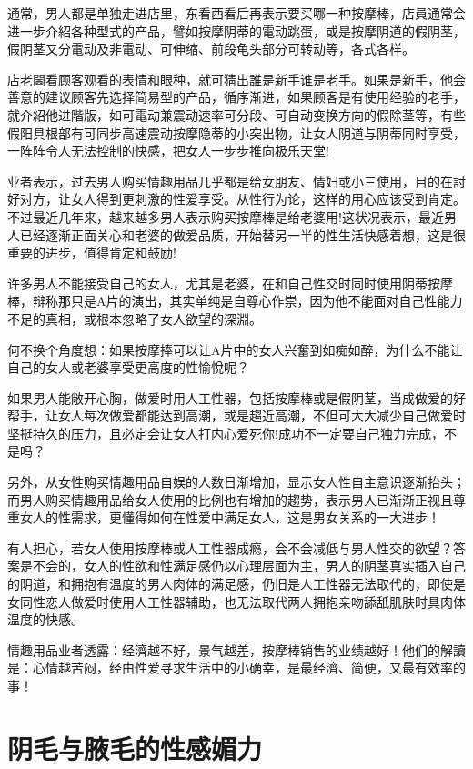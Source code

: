 \documentclass[12pt,UTF8]{ctexbook}
\begin{document}
通常，男人都是单独走进店里，东看西看后再表示要买哪一种按摩棒，店員通常会进一步介紹各种型式的产品，譬如按摩阴蒂的電动跳蛋，或是按摩阴道的假阴茎，假阴茎又分電动及非電动、可伸缩、前段龟头部分可转动等，各式各样。

店老閪看顾客观看的表情和眼种，就可猜出誰是新手谁是老手。如果是新手，他会善意的建议顾客先选择简易型的产品，循序渐进，如果顾客是有使用经验的老手，就介紹他进階版，如可電动兼震动速率可分段、可自动变换方向的假除茎等，有些假阳具根部有可同步高速震动按摩隐蒂的小突出物，让女人阴道与阴蒂同时享受，一阵阵令人无法控制的快感，把女人一步步推向极乐天堂!

业者表示，过去男人购买情趣用品几乎都是给女朋友、情妇或小三使用，目的在討好对方，让女人得到更刺激的性爱享受。从性行为论，这样的用心应该受到肯定。不过最近几年来，越来越多男人表示购买按摩棒是给老婆用!这状况表示，最近男人已经逐渐正面关心和老婆的做爱品质，开始替另一半的性生活快感着想，这是很重要的进步，值得肯定和鼓励!

许多男人不能接受自己的女人，尤其是老婆，在和自己性交时同时使用阴蒂按摩棒，辩称那只是A片的演出，其实单纯是自尊心作崇，因为他不能面对自己性能力不足的真相，或根本忽略了女人欲望的深淵。

何不换个角度想：如果按摩捧可以让A片中的女人兴奮到如痴如醉，为什么不能让自己的女人或老婆享受更高度的性愉悅呢？

如果男人能敞开心胸，做爱时用人工性器，包括按摩棒或是假阴茎，当成做爱的好帮手，让女人每次做爱都能达到高潮，或是趨近高潮，不但可大大减少自己做爱时坚挺持久的压力，且必定会让女人打内心爱死你!成功不一定要自己独力完成，不是吗？

另外，从女性购买情趣用品自娱的人数日渐增加，显示女人性自主意识逐渐抬头；而男人购买情趣用品给女人使用的比例也有增加的趨势，表示男人已渐渐正视且尊重女人的性需求，更懂得如何在性爱中满足女人，这是男女关系的一大进步！

有人担心，若女人使用按摩棒或人工性器成瘾，会不会减低与男人性交的欲望？答案是不会的，女人的性欲和性满足感仍以心理层面为主，男人的阴茎真实插入自己的阴道，和拥抱有温度的男人肉体的满足感，仍旧是人工性器无法取代的，即使是女同性恋人做爱时使用人工性器辅助，也无法取代两人拥抱亲吻舔舐肌肤时具肉体温度的快感。

情趣用品业者透露：经濟越不好，景气越差，按摩棒销售的业绩越好！他们的解讀是：心情越苦闷，经由性爱寻求生活中的小确幸，是最经濟、简便，又最有效率的事！

\chapter{阴毛与腋毛的性感媚力}
\end{document}
